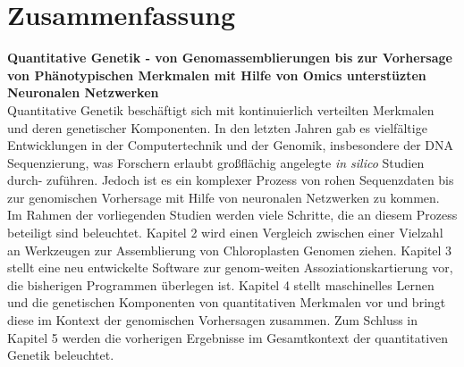 \chapter{Zusammenfassung} %
\textbf{Quantitative Genetik - von Genomassemblierungen bis zur Vorhersage von Ph\"{a}notypischen Merkmalen mit Hilfe von Omics unterstüzten Neuronalen Netzwerken} \\
Quantitative Genetik beschäftigt sich mit kontinuierlich verteilten Merkmalen und deren
genetischer Komponenten. In den letzten Jahren gab es vielfältige Entwicklungen in der
Computertechnik und der Genomik, insbesondere der DNA Sequenzierung, was Forschern erlaubt
großflächig angelegte \textit{in silico} Studien durch- zuführen. Jedoch ist es ein
komplexer Prozess von rohen Sequenzdaten bis zur genomischen Vorhersage mit Hilfe von
neuronalen Netzwerken zu kommen. Im Rahmen der vorliegenden Studien werden viele Schritte,
die an diesem Prozess beteiligt sind beleuchtet. Kapitel 2 wird einen Vergleich zwischen
einer Vielzahl an Werkzeugen zur Assemblierung von Chloroplasten Genomen ziehen. Kapitel 3
stellt eine neu entwickelte Software zur genom-weiten Assoziationskartierung vor, die
bisherigen Programmen überlegen ist. Kapitel 4 stellt maschinelles Lernen und die
genetischen Komponenten von quantitativen Merkmalen vor und bringt diese im Kontext der
genomischen Vorhersagen zusammen. Zum Schluss in Kapitel 5 werden die vorherigen
Ergebnisse im Gesamtkontext der quantitativen Genetik beleuchtet.



     





